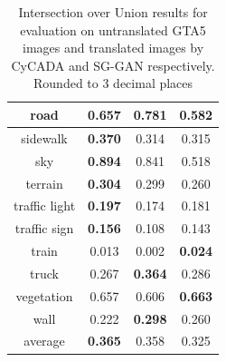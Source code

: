 \begin{table}
\begin{tabular}{|c|c|c|c|}
		\hline 
		road & 0.657 & \textbf{0.781} & 0.582 \\ 
		\hline 
		sidewalk & \textbf{0.370} & 0.314 & 0.315 \\ 
		\hline 
		sky & \textbf{0.894} & 0.841 & 0.518 \\ 
		\hline 
		terrain & \textbf{0.304} & 0.299 & 0.260 \\ 
		\hline 
		traffic light & \textbf{0.197} & 0.174 & 0.181 \\ 
		\hline 
		traffic sign & \textbf{0.156} & 0.108 & 0.143 \\ 
		\hline 
		train & 0.013 & 0.002 & \textbf{0.024} \\ 
		\hline 
		truck & 0.267 & \textbf{0.364} & 0.286 \\ 
		\hline 
		vegetation & 0.657 & 0.606 & \textbf{0.663} \\ 
		\hline 
		wall & 0.222 & \textbf{0.298} & 0.260 \\ 
		\hline \hline 
		average & \textbf{0.365} & 0.358 & 0.325\\
		\hline
	\end{tabular} 
	\caption{Intersection over Union results for evaluation on untranslated GTA5 images and translated images by CyCADA and SG-GAN respectively. Rounded to 3 decimal places}
	\label{table:results}
\end{table}

